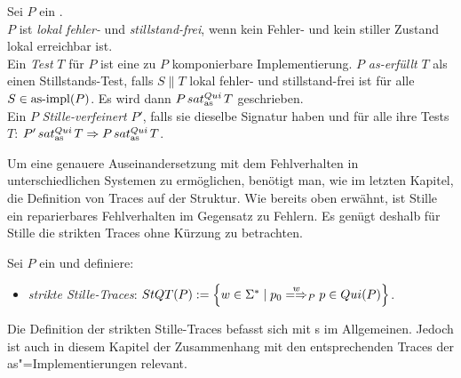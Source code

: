 \begin{Def}
  \label{StilleTestDef}
  Sei $P$ ein \MEIO{}.\\
  $P$ ist \emph{lokal fehler-} und \emph{stillstand-frei}, wenn kein Fehler-
  und kein stiller Zustand lokal erreichbar ist.\\
  Ein \emph{Test} $T$ für $P$ ist eine zu $P$ komponierbare Implementierung.
  $P$ \emph{as-erfüllt} $T$ als einen Stillstands-Test, falls $S\|T$ lokal
  fehler- und stillstand-frei ist für alle $S\in \mathrm{as}\text{-}\mathrm{impl} (P)$. Es wird dann $P
  \hspace{0.05cm}sat_\mathrm{as}^{Qui}\hspace{0.05cm} T$ geschrieben.\\
  Ein \MEIO{} $P$ \emph{Stille-verfeinert} $P'$, falls sie dieselbe Signatur
  haben und für alle ihre Tests $T$: $P'\hspace{0.05cm}sat_\mathrm{as}^{Qui}\hspace{0.05cm} T \Rightarrow P\hspace{0.05cm}sat_\mathrm{as}^{Qui}\hspace{0.05cm} T$.
\end{Def}

Um eine genauere Auseinandersetzung mit dem Fehlverhalten in unterschiedlichen
Systemen zu ermöglichen, benötigt man, wie im letzten Kapitel, die Definition
von Traces auf der Struktur. Wie bereits oben erwähnt, ist Stille ein
reparierbares Fehlverhalten im Gegensatz zu Fehlern. Es genügt deshalb für
Stille die strikten Traces ohne Kürzung zu betrachten.

\begin{Def}
  \label{StilleTraceDef}
  Sei $P$ ein \MEIO{} und definiere:
  \begin{itemize}
    \item \emph{strikte Stille-Traces}: $\StQT (P) := \left\{w\in\Sigma ^*\mid
      p_0 \weakmay[w]_P p\in Qui(P)\right\}$.
  \end{itemize}
\end{Def}

Die Definition der strikten Stille-Traces befasst sich mit \MEIO{}s im
Allgemeinen. Jedoch ist auch in diesem Kapitel der Zusammenhang mit den
entsprechenden Traces der as"=Implementierungen relevant.

